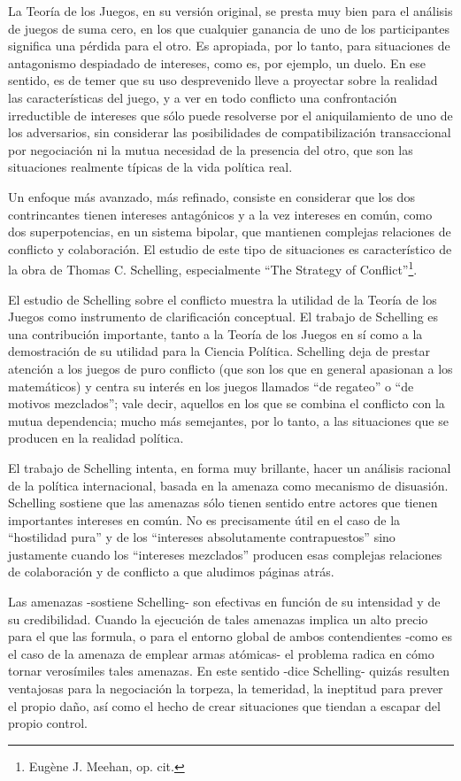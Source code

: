 \documentclass[
]{book}
\begin{document}
La Teoría de los Juegos, en su versión original, se presta muy bien para el análisis de juegos de suma cero, en los que cualquier ganancia de uno de los participantes significa una pérdida para el otro. Es apropiada, por lo tanto, para situaciones de antagonismo despiadado de intereses, como es, por ejemplo, un duelo. En ese sentido, es de temer que su uso desprevenido lleve a proyectar sobre la realidad las características del juego, y a ver en todo conflicto una confrontación irreductible de intereses que sólo puede resolverse por el aniquilamiento de uno de los adversarios, sin considerar las posibilidades de compatibilización transaccional por negociación ni la mutua necesidad de la presencia del otro, que son las situaciones realmente típicas de la vida política real.

Un enfoque más avanzado, más refinado, consiste en considerar que los dos contrincantes tienen intereses antagónicos y a la vez intereses en común, como dos superpotencias, en un sistema bipolar, que mantienen complejas relaciones de conflicto y colaboración. El estudio de este tipo de situaciones es característico de la obra de Thomas C. Schelling, especialmente ``The Strategy of Conflict''\footnote{Eugène J. Meehan, op. cit.}.

El estudio de Schelling sobre el conflicto muestra la utilidad de la Teoría de los Juegos como instrumento de clarificación conceptual. El trabajo de Schelling es una contribución importante, tanto a la Teoría de los Juegos en sí como a la demostración de su utilidad para la Ciencia Política. Schelling deja de prestar atención a los juegos de puro conflicto (que son los que en general apasionan a los matemáticos) y centra su interés en los juegos llamados ``de regateo'' o ``de motivos mezclados''; vale decir, aquellos en los que se combina el conflicto con la mutua dependencia; mucho más semejantes, por lo tanto, a las situaciones que se producen en la realidad política.

El trabajo de Schelling intenta, en forma muy brillante, hacer un análisis racional de la política internacional, basada en la amenaza como mecanismo de disuasión. Schelling sostiene que las amenazas sólo tienen sentido entre actores que tienen importantes intereses en común. No es precisamente útil en el caso de la ``hostilidad pura'' y de los ``intereses absolutamente contrapuestos'' sino justamente cuando los ``intereses mezclados'' producen esas complejas relaciones de colaboración y de conflicto a que aludimos páginas atrás.

Las amenazas -sostiene Schelling- son efectivas en función de su intensidad y de su credibilidad. Cuando la ejecución de tales amenazas implica un alto precio para el que las formula, o para el entorno global de ambos contendientes -como es el caso de la amenaza de emplear armas atómicas- el problema radica en cómo tornar verosímiles tales amenazas. En este sentido -dice Schelling- quizás resulten ventajosas para la negociación la torpeza, la temeridad, la ineptitud para prever el propio daño, así como el hecho de crear situaciones que tiendan a escapar del propio control.
\end{document}
